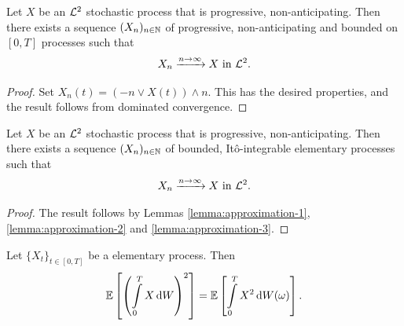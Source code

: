 \begin{lemma}
  \label{lemma:approximation-3}
  Let $X$ be an $\mathcal{L}^2$ stochastic process that is progressive, non-anticipating. Then there exists a sequence $(X_n)_{n\in\mathbb{N}}$ of progressive, non-anticipating and bounded on $[0, T]$ processes such that
  $$X_n \xrightarrow{n\to\infty} X \text{ in } \mathcal{L}^2.$$
\end{lemma}
\begin{proof}
  Set $X_n(t) = (-n \vee X(t)) \wedge n$. This has the desired properties, and the result follows from dominated convergence.
\end{proof}

\begin{theorem}
  Let $X$ be an $\mathcal{L}^2$ stochastic process that is progressive, non-anticipating. Then there exists a sequence $(X_n)_{n\in\mathbb{N}}$ of bounded, Itô-integrable elementary processes such that
  $$X_n \xrightarrow{n\to\infty} X \text{ in } \mathcal{L}^2.$$
\end{theorem}
\begin{proof}
  The result follows by Lemmas \ref{lemma:approximation-1}, \ref{lemma:approximation-2} and \ref{lemma:approximation-3}.
\end{proof}

\begin{lemma}
  Let $\{X_t\}_{t\in[0,T]}$ be a elementary process. Then
  $$\mathbb{E}\left[\left(\int\limits_0^T X\,\mathrm{d} W\right)^2\right] = \mathbb{E}\left[\int\limits_0^T X^2\,\mathrm{d} W(\omega)\right].$$
\end{lemma}


